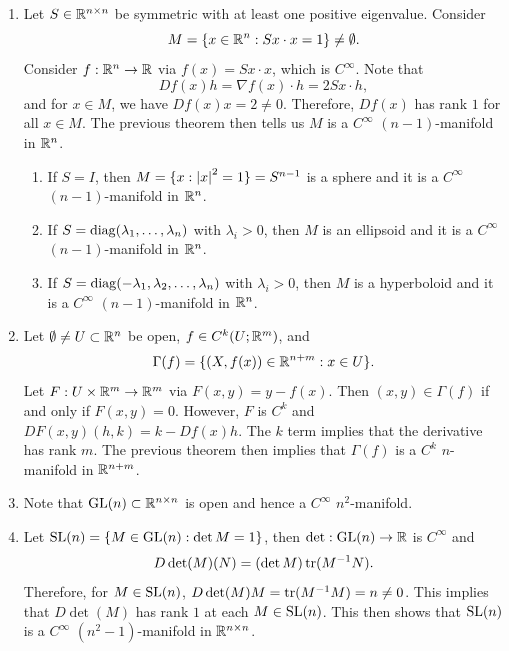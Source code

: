 \documentclass[a4paper]{article}
\begin{document}
\begin{eg}
\begin{enumerate}
\item Let $S \in \mathbb{R}^{n \times n}$ be symmetric with at least 
one positive eigenvalue. Consider
\[
M = \{x \in \mathbb{R}^n : 
S x \cdot x = 1\} \neq \emptyset.
\]
Consider $f : \mathbb{R}^n \to \mathbb{R}$ via $f(x) = Sx \cdot x$, 
which is $C^\infty$. Note that 
\[
Df(x) h = \nabla f(x) \cdot h = 2Sx \cdot h,
\]
and for $x \in M$, we have $Df(x) x = 2 \neq 0$. 
Therefore, $Df(x)$ has rank $1$ for all $x \in M$. 
The previous theorem then tells us $M$ is a $C^\infty$
$(n-1)$-manifold in $\mathbb{R}^n$.

\begin{enumerate}
  \item If $S = I$, then 
  $M = \{x : \left\lvert x\right\rvert^2 = 1\} = S^{n-1}$ is a sphere and 
  it is a $C^\infty$ $(n-1)$-manifold in $\mathbb{R}^n$.

  \item If $S = \operatorname{diag}(\lambda_1, \dots, \lambda_n)$ 
  with $\lambda_i > 0$, then $M$ is an ellipsoid 
  and it is a $C^\infty$ $(n-1)$-manifold in $\mathbb{R}^n$. 

  \item If $S = \operatorname{diag}(-\lambda_1, \lambda_2, \dots, \lambda_n)$
  with $\lambda_i > 0$, then $M$ is a hyperboloid and it 
  is a $C^\infty$ $(n-1)$-manifold in $\mathbb{R}^n$.
\end{enumerate} 

\item Let $\emptyset \neq U \subset \mathbb{R}^n$ be open, 
$f \in C^k(U; \mathbb{R}^m)$, and 
\[
\Gamma(f) = \{(X, f(x)) \in \mathbb{R}^{n+m} : x \in U\}.
\]
Let $F : U \times \mathbb{R}^m \to \mathbb{R}^m$ via $F(x, y) = y - f(x)$.
Then $(x, y) \in \Gamma(f)$ if and only if $F(x, y) = 0$. 
However, $F$ is $C^k$ and $DF(x, y) (h, k) = k - Df(x) h$.
The $k$ term implies that the derivative has rank $m$.
The previous theorem then implies that $\Gamma(f)$ is 
a $C^k$ $n$-manifold in $\mathbb{R}^{n+m}$. 

\item Note that $\mathrm{GL}(n) \subset \mathbb{R}^{n \times n}$ is open 
and hence a $C^\infty$ $n^2$-manifold.

\item Let $\mathrm{SL}(n) = \{M \in \mathrm{GL}(n) : \det M = 1\}$, 
then $\det: \mathrm{GL}(n) \to \mathbb{R}$ is $C^\infty$ and 
\[
D \det(M) (N) = (\det M) \operatorname{tr}(M^{-1} N).
\]
Therefore, for $M \in \mathrm{SL}(n)$, $D \det(M) M = \operatorname{tr}(M^{-1} 
M) = n \neq 0$. This implies that $D \det(M)$ has rank 
$1$ at each $M \in \mathrm{SL}(n)$. This then shows that 
$\mathrm{SL}(n)$ is a $C^\infty$ $(n^2 - 1)$-manifold in $\mathbb{R}^{n \times n}$.


\end{enumerate}
\end{eg}
\end{document}
